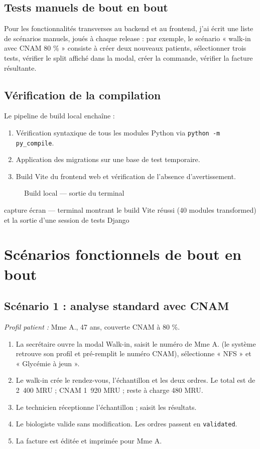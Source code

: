 \documentclass[12pt, a4paper, oneside]{report}
\newcommand{\placeholderFigure}[3][0.75]{%
  \begin{figure}[ht]
    \centering
    \fbox{\begin{minipage}[c][6.5cm][c]{#1\linewidth}
      \centering
      \textit{\small À insérer : #3}
    \end{minipage}}
    \caption{#2}
    \label{fig:#3}
  \end{figure}%
}
\begin{document}
\subsection{Tests manuels de bout en bout}
Pour les fonctionnalités transverses au backend et au frontend, j'ai
écrit une liste de scénarios manuels, joués à chaque release : par
exemple, le scénario « walk-in avec CNAM 80 \% » consiste à créer
deux nouveaux patients, sélectionner trois tests, vérifier le split
affiché dans la modal, créer la commande, vérifier la facture
résultante.

\subsection{Vérification de la compilation}
Le pipeline de build local enchaîne :

\begin{enumerate}
  \item Vérification syntaxique de tous les modules Python via
        \texttt{python -m py\_compile}.
  \item Application des migrations sur une base de test temporaire.
  \item Build Vite du frontend web et vérification de l'absence
        d'avertissement.
\end{enumerate}

\placeholderFigure{Build local — sortie du terminal}%
{build-terminal}{capture écran — terminal montrant le build Vite
réussi (40 modules transformed) et la sortie d'une session de tests
Django}

\section{Scénarios fonctionnels de bout en bout}

\subsection{Scénario 1 : analyse standard avec CNAM}
\textit{Profil patient :} Mme A., 47 ans, couverte CNAM à 80 \%.

\begin{enumerate}
  \item La secrétaire ouvre la modal Walk-in, saisit le numéro de
        Mme A. (le système retrouve son profil et pré-remplit le
        numéro CNAM), sélectionne « NFS » et « Glycémie à jeun ».
  \item Le walk-in crée le rendez-vous, l'échantillon et les deux
        ordres. Le total est de 2~400 MRU ; CNAM 1~920 MRU ; reste à
        charge 480 MRU.
  \item Le technicien réceptionne l'échantillon ; saisit les
        résultats.
  \item Le biologiste valide sans modification. Les ordres passent en
        \texttt{validated}.
  \item La facture est éditée et imprimée pour Mme A.
\end{enumerate}
\end{document}

